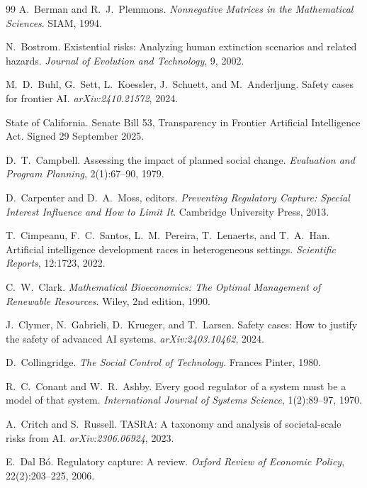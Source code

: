 \documentclass[11pt]{article}
\theoremstyle{plain}
\theoremstyle{definition}
\begin{document}
\begin{thebibliography}{99}
 A.~Berman and R.~J.~Plemmons. \emph{Nonnegative Matrices in the Mathematical Sciences}. SIAM, 1994.

 N.~Bostrom. Existential risks: Analyzing human extinction scenarios and related hazards. \emph{Journal of Evolution and Technology}, 9, 2002.

 M.~D.~Buhl, G.~Sett, L.~Koessler, J.~Schuett, and M.~Anderljung. Safety cases for frontier AI. \emph{arXiv:2410.21572}, 2024.

 State of California. Senate Bill 53, Transparency in Frontier Artificial Intelligence Act. Signed 29 September 2025.

 D.~T.~Campbell. Assessing the impact of planned social change. \emph{Evaluation and Program Planning}, 2(1):67--90, 1979.

 D.~Carpenter and D.~A.~Moss, editors. \emph{Preventing Regulatory Capture: Special Interest Influence and How to Limit It}. Cambridge University Press, 2013.

 T.~Cimpeanu, F.~C.~Santos, L.~M.~Pereira, T.~Lenaerts, and T.~A.~Han. Artificial intelligence development races in heterogeneous settings. \emph{Scientific Reports}, 12:1723, 2022.

 C.~W.~Clark. \emph{Mathematical Bioeconomics: The Optimal Management of Renewable Resources}. Wiley, 2nd edition, 1990.

 J.~Clymer, N.~Gabrieli, D.~Krueger, and T.~Larsen. Safety cases: How to justify the safety of advanced AI systems. \emph{arXiv:2403.10462}, 2024.

 D.~Collingridge. \emph{The Social Control of Technology}. Frances Pinter, 1980.

 R.~C.~Conant and W.~R.~Ashby. Every good regulator of a system must be a model of that system. \emph{International Journal of Systems Science}, 1(2):89--97, 1970.

 A.~Critch and S.~Russell. TASRA: A taxonomy and analysis of societal-scale risks from AI. \emph{arXiv:2306.06924}, 2023.

 E.~Dal B\'o. Regulatory capture: A review. \emph{Oxford Review of Economic Policy}, 22(2):203--225, 2006.


\end{thebibliography}
\end{document}

